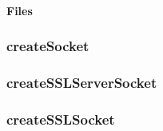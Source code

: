 \paragraph{Files}
\begin{itemize}
\end{itemize}

\subsubsection{createSocket}

\subsubsection{createSSLServerSocket}

\subsubsection{createSSLSocket}
